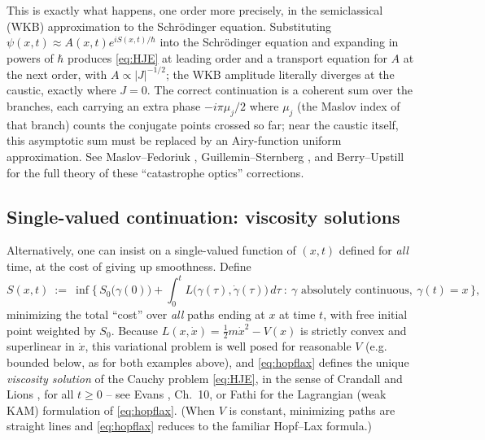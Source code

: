 \documentclass[11pt]{article}
\theoremstyle{plain}
\theoremstyle{definition}
\theoremstyle{remark}
\begin{document}
This is exactly what happens, one order more precisely, in the semiclassical
(WKB) approximation to the Schr\"odinger equation. Substituting
$\psi(x,t)\approx A(x,t)e^{iS(x,t)/\hbar}$ into the Schr\"odinger equation and
expanding in powers of $\hbar$ produces \eqref{eq:HJE} at leading order and a
transport equation for $A$ at the next order, with $A\propto |J|^{-1/2}$; the
WKB amplitude literally diverges at the caustic, exactly where $J=0$. The
correct continuation is a coherent sum over the branches, each carrying an
extra phase $-i\pi\mu_j/2$ where $\mu_j$ (the Maslov index of that branch)
counts the conjugate points crossed so far; near the caustic itself, this
asymptotic sum must be replaced by an Airy-function uniform approximation. See
Maslov--Fedoriuk \cite{MaslovFedoriuk}, Guillemin--Sternberg
\cite{GuilleminSternberg}, and Berry--Upstill \cite{BerryUpstill} for the full
theory of these ``catastrophe optics'' corrections.

\subsection{Single-valued continuation: viscosity solutions}
\label{sec:viscosity}

Alternatively, one can insist on a single-valued function of $(x,t)$ defined
for \emph{all} time, at the cost of giving up smoothness. Define
\begin{equation}
S(x,t) \ :=\ \inf\Big\{\, S_0\big(\gamma(0)\big) + \int_0^tL\big(\gamma(\tau),\dot\gamma(\tau)\big)\,d\tau \ :\ \gamma \text{ absolutely continuous}, \ \gamma(t)=x \,\Big\},
\label{eq:hopflax}
\end{equation}
minimizing the total ``cost'' over \emph{all} paths ending at $x$ at time $t$,
with free initial point weighted by $S_0$. Because $L(x,\dot x)=\tfrac12m\dot
x^2-V(x)$ is strictly convex and superlinear in $\dot x$, this variational
problem is well posed for reasonable $V$ (e.g. bounded below, as for both
examples above), and \eqref{eq:hopflax} defines the unique \emph{viscosity
solution} of the Cauchy problem \eqref{eq:HJE}, in the sense of Crandall and
Lions \cite{CrandallLions}, for all $t\ge 0$ -- see Evans \cite{Evans}, Ch.~10,
or Fathi \cite{Fathi} for the Lagrangian (weak KAM) formulation of
\eqref{eq:hopflax}. (When $V$ is constant, minimizing paths are straight lines
and \eqref{eq:hopflax} reduces to the familiar Hopf--Lax formula.)
\end{document}
